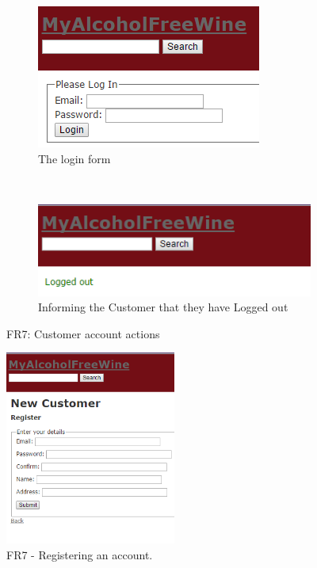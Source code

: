 \documentclass[12pt]{article}
\begin{document}
\begin{figure}[H]
    \centering
    \begin{subfigure}[b]{0.4\textwidth}
        \includegraphics[width=\textwidth]{assets/FR7_screen_1}
        \caption{The login form}
        \label{fig:FR7 Login}
    \end{subfigure}
    ~ %
    \begin{subfigure}[b]{0.4\textwidth}
        \includegraphics[width=\textwidth]{assets/FR7_screen_2}
        \caption{Informing the Customer that they have Logged out}
        \label{fig:FR7 Logout}
    \end{subfigure}
    \caption{FR7: Customer account actions}\label{fig:FR7 Customer Account 1}
\end{figure}

\begin{figure}[H]
        \centering
                \includegraphics[width=0.5\textwidth]{assets/FR7_screen_5}
                \caption{FR7 - Registering an account.}
                \label{fig: FR7 register.} 
\end{figure}
\end{document}
